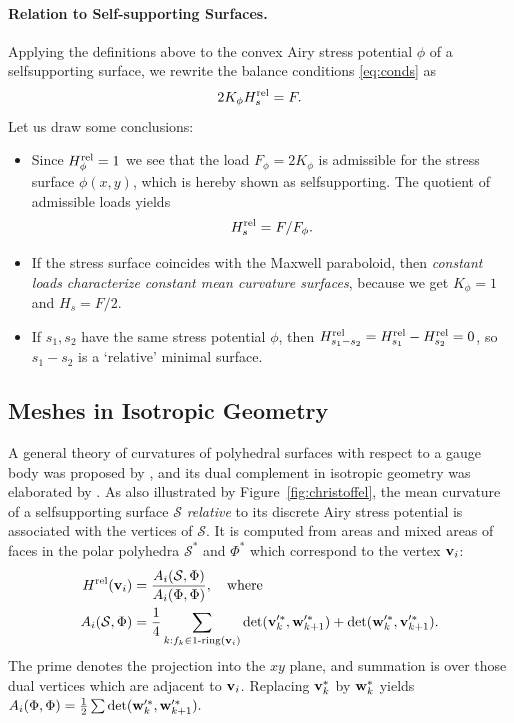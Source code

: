 \documentclass[annual]{acmsiggraph}
\def\rel{{\mathord{\text{\rm rel}}}}
\def\SS{{\mathcal S}}
\begin{document}
\paragraph{Relation to Self-supporting Surfaces.}

Applying the definitions above to the convex Airy stress potential $\phi$ 
of a self\dash supporting surface, we rewrite the balance conditions 
\eqref{eq:conds} as
	\begin{equation}
	2 K_\phi H_s^\rel  = F.
	\label{equigeo}
	\end{equation}
 Let us draw some conclusions:

\begin{itemize}\itemsep-\parsep

\item Since $H^\rel_\phi=1$ we see that the load $F_\phi=2K_\phi$ is 
admissible for the stress surface $\phi(x,y)$, which is hereby shown as 
self\dash supporting. The quotient of admissible loads yields
	\begin{equation}
	 H_s^\rel = F/F_\phi. \label{equigeo2}
	\end{equation}

\item If the stress surface coincides with the Maxwell paraboloid, then 
{\em constant loads characterize constant mean curvature surfaces}, 
because we get $K_\phi=1$ and $H_s=F/2$.

\item If $s_1,s_2$ have the same stress potential $\phi$, then 
$H^\rel_{s_1-s_2}=H^\rel_{s_1}-H^\rel_{s_2}=0$, so $s_1-s_2$ is a 
`relative' minimal surface.

\end{itemize}



\subsection{Meshes in Isotropic Geometry} \label{sec:discrete}

A general theory of curvatures of polyhedral surfaces with respect to a 
gauge body was proposed by \cite{Pottmann2007b}, and its dual complement 
in isotropic geometry was elaborated by \cite{Pottmann2007}. As also 
illustrated by Figure~\ref{fig:christoffel}, the mean curvature of a 
self\dash supporting surface $\SS$ {\em relative} to its discrete Airy 
stress potential is associated with the vertices of $\SS$. It is computed 
from areas and mixed areas of faces in the polar polyhedra $\SS^*$ and 
$\Phi^*$ which correspond to the vertex ${\mathbf v}_i$:
	\begin{align*}
	H^\rel(\vw_i)
	&= {A_i(\SS,\Phi) \over A_i(\Phi,\Phi)}, 
	\quad\text{where}
	\\
		A_i (\SS,\Phi) 
	&= 
	\frac{1}{4}
		\sum_{k:f_k\in \text{1-ring}(\vw_i)}
		\det(\vw'^*_k, \ww'^*_{k+1}) 
		+ \det(\ww'^*_k, \vw'^*_{k+1}).
	\end{align*}
 The prime denotes the projection into the $xy$ plane, and summation is 
over those dual vertices which are adjacent to ${\mathbf v}_i$. 
Replacing ${\mathbf v}_k^*$ by ${\mathbf w}_k^*$ yields
	$
		A_i (\Phi,\Phi) 
	= 
	\frac{1}{2}
		\sum
		\det({\mathbf w}'^*_k, {\mathbf w}'^*_{k+1}).
	$
\end{document}
